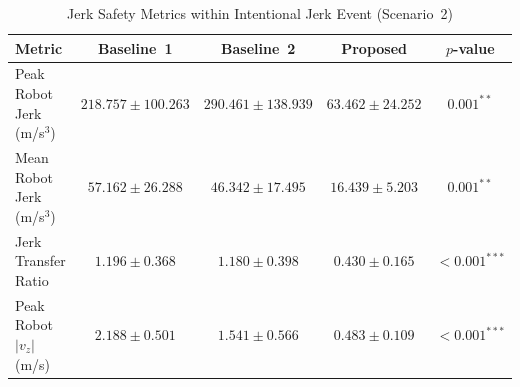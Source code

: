\begin{table}[htbp]
\centering
\caption{Jerk Safety Metrics within Intentional Jerk Event (Scenario~2)}
\label{tab:s2_jerk}
\begin{tabular}{lcccc}
\toprule
\textbf{Metric} & \textbf{Baseline~1} & \textbf{Baseline~2} & \textbf{Proposed} & \textbf{$p$-value} \\
\midrule
Peak Robot Jerk (m/s$^3$) & $218.757\pm100.263$ & $290.461\pm138.939$ & $\mathbf{63.462\pm24.252}$ & $0.001^{**}$ \\
Mean Robot Jerk (m/s$^3$) & $57.162\pm26.288$ & $46.342\pm17.495$ & $\mathbf{16.439\pm5.203}$ & $0.001^{**}$ \\
Jerk Transfer Ratio & $1.196\pm0.368$ & $1.180\pm0.398$ & $\mathbf{0.430\pm0.165}$ & $<0.001^{***}$ \\
Peak Robot $|v_z|$ (m/s) & $2.188\pm0.501$ & $1.541\pm0.566$ & $\mathbf{0.483\pm0.109}$ & $<0.001^{***}$ \\
\bottomrule
\end{tabular}
\end{table}